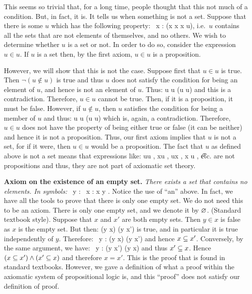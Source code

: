 This seems so trivial that, for a long time, people thought that this not much
of a condition. But, in fact, it is. It tells us when something is not a set.
Suppose that there is some $u$ which has the following property:
\bse
\forall \, x : (x \notin x \eqv x \in u),
\ese
i.e.\ $u$ contains all the sets that are not elements of themselves, and no
others. We wish to determine whether $u$ is a set or not. In order to do so,
consider the expression $u\in u$. If $u$ is a set then, by the first axiom,
$u\in u$ is a proposition.

However, we will show that this is not the case. Suppose first that $u\in u$
is true. Then $\neg(u\notin u)$ is true and thus $u$ does not satisfy the
condition for being an element of $u$, and hence is not an element of $u$.
Thus:
\bse
u \in u \imp \neg(u \in u)
\ese
and this is a contradiction. Therefore, $u\in u$ cannot be true. Then, if it
is a proposition, it must be false. However, if $u \notin u$, then $u$
satisfies the condition for being a member of $u$ and thus:
\bse
u \notin u \imp \neg(u \notin u)
\ese
which is, again, a contradiction. Therefore, $u\in u$ does not have the
property of being either true or false (it can be neither) and hence it is not
a proposition. Thus, our first axiom implies that $u$ is not a set, for if it
were, then $u\in u$ would be a proposition.
\ee
\br
The fact that $u$ as defined above is not a set means that expressions like:
\bse
u\in u , \quad x\in u , \quad u\in x , \quad x \notin u , \quad \t{etc.}
\ese
are not propositions and thus, they are not part of axiomatic set theory.
\er

\textbf{Axiom on the existence of an empty set.} \emph{There exists a set
that contains no elements. In symbols:}
\bse
\exists \, y : \forall \, x : x \notin y .
\ese
Notice the use of ``an'' above. In fact, we have all the tools to prove that
there is only one empty set. We do not need this to be an axiom.
\bt
There is only one empty set, and we denote it by $\varnothing$.
\et
\bq(Standard textbook style). Suppose that $x$ and $x'$ are both empty sets.
Then $y\in x$ is false as $x$ is the empty set. But then:
\bse
 (y \in x) \imp (y \in x')
\ese
is true, and in particular it is true independently of $y$. Therefore:
\bse
\forall \, y : (y \in x) \imp (y \in x')
\ese
and hence $x \subseteq x'$. Conversely, by the same argument, we have:
\bse
\forall \, y : (y \in x') \imp (y \in x)
\ese
and thus $x' \subseteq x$. Hence $(x \subseteq x') \land (x' \subseteq x)$ and therefore $x =
x'$.
\eq
This is the proof that is found in standard textbooks. However, we gave a
definition of what a proof within the axiomatic system of propositional logic
is, and this ``proof'' does not satisfy our definition of proof.

